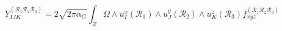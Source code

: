 \begin{equation}
\label{Yukawa}
Y^{ ( \mathcal{R}_{1} \mathcal{R}_{2} \mathcal{R}_{3} ) }_{IJK}
 = 2 \sqrt{ 2 \pi \alpha_{G} }
   \int_{Z} \Omega \wedge u^{x}_{I}(\mathcal{R}_{1}) \wedge 
                          u^{y}_{J}(\mathcal{R}_{2}) \wedge
                          u^{z}_{K}(\mathcal{R}_{3}) 
            f^{ (\mathcal{R}_{1} \mathcal{R}_{2} \mathcal{R}_{3} ) }_{xyz}
\end{equation}

